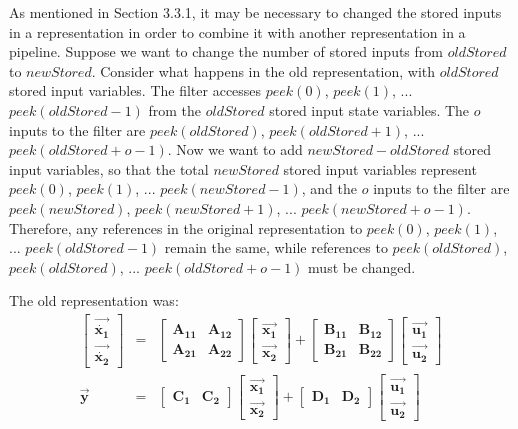     As mentioned in Section 3.3.1, it may be necessary to changed the
stored inputs in a representation in order to combine it with
another representation in a pipeline. Suppose we want to change
the number of stored inputs from $oldStored$ to $newStored$.
Consider what happens in the old representation, with $oldStored$
stored input variables. The filter accesses $peek(0)$, $peek(1)$,
... $peek(oldStored-1)$ from the $oldStored$ stored input state
variables. The $o$ inputs to the filter are $peek(oldStored)$,
$peek(oldStored+1)$, ... $peek(oldStored+o-1)$. Now we want to add
$newStored-oldStored$ stored input variables, so that the total
$newStored$ stored input variables represent $peek(0)$, $peek(1)$,
... $peek(newStored-1)$, and the $o$ inputs to the filter are
$peek(newStored)$, $peek(newStored+1)$, ... $peek(newStored+o-1)$.
Therefore, any references in the original representation to
$peek(0)$, $peek(1)$, ... $peek(oldStored-1)$ remain the same,
while references to $peek(oldStored)$, $peek(oldStored)$, ...
$peek(oldStored+o-1)$ must be changed.

    The old representation was:
\begin{eqnarray*}
\left [ \begin{array} {c} \vec{\dot{\mathbf{x_1}}} \\
\vec{\dot{\mathbf{x_2}}}
\end{array} \right ] & = & \left [ \begin{array} {cc} \mathbf{A_{11}} & \mathbf{A_{12}} \\
\mathbf{A_{21}} & \mathbf{A_{22}} \end{array} \right ] \left [
\begin{array} {c} \vec{\mathbf{x_1}} \\ \vec{\mathbf{x_2}} \end{array} \right ]
 + \left [ \begin{array} {cc} \mathbf{B_{11}} & \mathbf{B_{12}} \\
\mathbf{B_{21}} & \mathbf{B_{22}} \end{array} \right ] \left[
\begin{array} {c} \vec{\mathbf{u_1}} \\ \vec{\mathbf{u_2}} \end{array} \right ] \\
\vec{\mathbf{y}} & = & \left [ \begin{array} {cc} \mathbf{C_1} &
\mathbf{C_2} \end{array} \right ] \left [
\begin{array} {c} \vec{\mathbf{x_1}} \\ \vec{\mathbf{x_2}} \end{array} \right ] +
\left [ \begin{array} {cc} \mathbf{D_1} & \mathbf{D_2}
\end{array} \right ] \left [ \begin{array} {c} \vec{\mathbf{u_1}} \\
\vec{\mathbf{u_2}} \end{array} \right ]
\end{eqnarray*}

